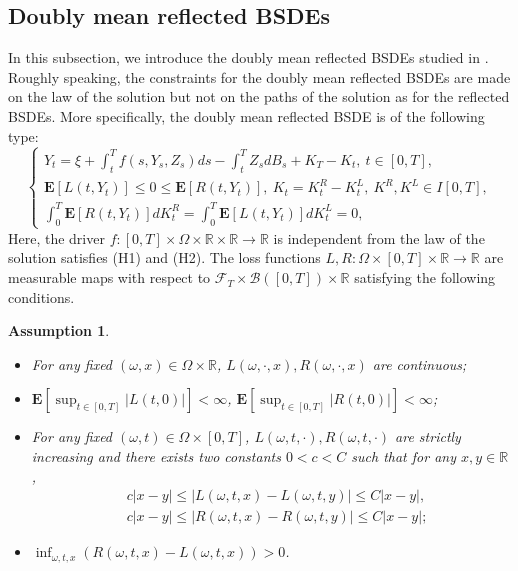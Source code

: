 \documentclass[10pt]{article}%
\numberwithin{equation}{section}
\newtheorem{assumption}[theorem]{Assumption}
\def \E{\mathbf{E}}
\begin{document}
\subsection{Doubly mean reflected BSDEs}
In this subsection, we introduce the doubly mean reflected BSDEs studied in \cite{Li'}. Roughly speaking, the constraints for the doubly mean reflected BSDEs are made on the law of the solution but not on the paths of the solution as for the reflected BSDEs. More specifically, the doubly mean reflected BSDE is of the following type:%
\begin{equation}\label{MRBSDE}
\begin{cases}
Y_t=\xi+\int_t^T f(s,Y_s,Z_s)ds-\int_t^T Z_s dB_s+K_T-K_t,\ t\in[0,T], \\
\E[L(t,Y_t)]\leq 0\leq \E[R(t,Y_t)], \ K_t=K^R_t-K^L_t,\ K^R,K^L\in I[0,T], \\
 \int_0^T \E[R(t,Y_t)]dK_t^R=\int_0^T \E[L(t,Y_t)]dK^L_t=0,
\end{cases}
\end{equation}
Here, the driver $f:[0,T]\times\Omega\times\mathbb{R}\times\mathbb{R}\rightarrow \mathbb{R}$ is independent from the law of the solution satisfies (H1) and (H2). The loss functions $L,R:\Omega\times [0,T]\times\mathbb{R}\rightarrow \mathbb{R}$ are measurable maps with respect to $\mathcal{F}_T\times \mathcal{B}([0,T])\times \mathcal{\mathbb{R}}$ satisfying the following conditions.

\begin{assumption}\label{ass2}
\begin{itemize}
\item[(1)] For any fixed $(\omega,x)\in \Omega\times\mathbb{R}$, $L(\omega,\cdot,x), R(\omega,\cdot,x)$ are continuous;%
\item[(2)]  $\E[\sup_{t\in[0,T]}|L(t,0)|]<\infty$, $\E[\sup_{t\in[0,T]}|R(t,0)|]<\infty$;%
\item[(3)] For any fixed $(\omega,t)\in \Omega\times [0,T]$, $L(\omega,t,\cdot),R(\omega,t,\cdot)$ are strictly increasing and there exists two constants $0<c<C$ such that for any $x,y\in \mathbb{R}$,
\begin{align*}
&c|x-y|\leq |L(\omega,t,x)-L(\omega,t,y)|\leq C|x-y|,\\
&c|x-y|\leq |R(\omega,t,x)-R(\omega,t,y)|\leq C|x-y|;
\end{align*}
\item[(4)] $\inf_{\omega,t,x} (R(\omega,t,x)-L(\omega,t,x))>0$.
\end{itemize}
\end{assumption}
 
\end{document}
